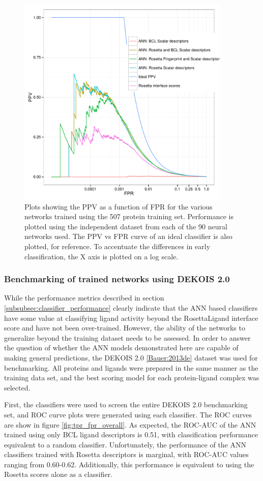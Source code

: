 \begin{figure}
\centering
\includegraphics[width=4in]{figures/hts/ppv_plot.pdf}
\caption{
Plots showing the \acs{PPV} as a function of \acs{FPR} for the various networks trained using the 507 protein training set.
Performance is plotted using the independent dataset from each of the 90 neural networks used.
The \acs{PPV} vs \acs{FPR} curve of an ideal classifier is also plotted, for reference.
To accentuate the differences in early classification, the X axis is plotted on a log scale.
}
\label{fig:ppv_plot}
\end{figure}

\subsubsection{Benchmarking of trained networks using DEKOIS 2.0}
While the performance metrics described in section \ref{subsubsec:classifier_performance} clearly indicate that the \ac{ANN} based classifiers have some value at classifying ligand activity beyond the RosettaLigand interface score and have not been over-trained.
However, the ability of the networks to generalize beyond the training dataset needs to be assessed.
In order to answer the question of whether the \ac{ANN} models demonstrated here are capable of making general predictions, the DEKOIS 2.0 \ref{Bauer:2013de} dataset was used for benchmarking. 
All proteins and ligands were prepared in the same manner as the training data set, and the best scoring model for each protein-ligand complex was selected.

First, the classifiers were used to screen the entire DEKOIS 2.0 benchmarking set, and \ac{ROC} curve plots were generated using each classifier.
The \ac{ROC} curves are show in figure \ref{fig:tpr_fpr_overall}.
As expected, the \ac{ROC-AUC} of the \ac{ANN} trained using only BCL ligand descriptors is 0.51, with classification performance equivalent to a random classifier.
Unfortunately, the performance of the ANN classifiers trained with Rosetta descriptors is marginal, with \ac{ROC-AUC} values ranging from 0.60-0.62.
Additionally, this performance is equivalent to using the Rosetta scores alone as a classifier.

